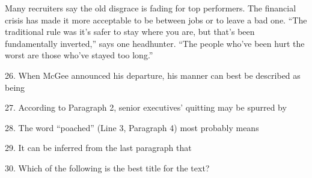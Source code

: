 \qquad Many recruiters say the old disgrace is fading for top performers. The financial crisis has made it more acceptable to be between jobs or to leave a bad one. ``The traditional rule was it's safer to stay where you are, but that's been fundamentally inverted,'' says one headhunter. ``The people who've been hurt the worst are those who've stayed too long.''

\vspace{6pt}

26. When McGee announced his departure, his manner can best be described as being\par

27. According to Paragraph 2, senior executives' quitting may be spurred by\par

28. The word ``poached'' (Line 3, Paragraph 4) most probably means\par

29. It can be inferred from the last paragraph that\par

30. Which of the following is the best title for the text?\par

